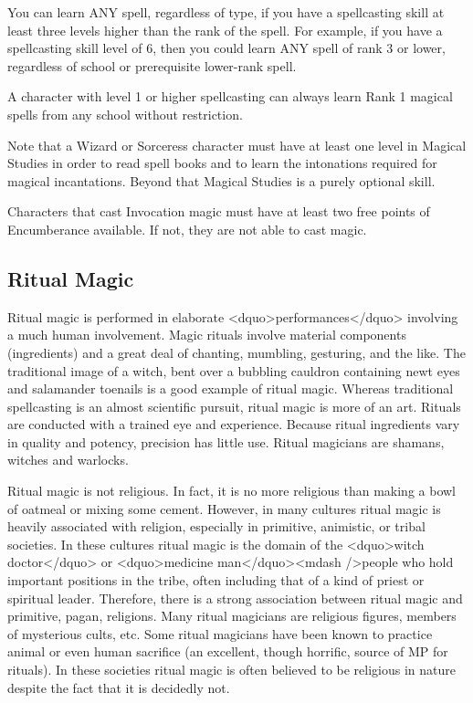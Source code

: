 You can learn ANY spell, regardless of type, if you have a
spellcasting skill at least three levels higher than the rank of the
spell.  For example, if you have a spellcasting skill level of 6, then
you could learn ANY spell of rank 3 or lower, regardless of school or
prerequisite lower-rank spell.

A character with level 1 or higher spellcasting can always learn Rank
1 magical spells from any school without restriction.

Note that a Wizard or Sorceress character must have at least one level
in Magical Studies in order to read spell books and to learn the
intonations required for magical incantations.  Beyond that Magical
Studies is a purely optional skill.

Characters that cast Invocation magic must have at least two free
points of Encumberance available.  If not, they are not able to cast
magic.


\subsection{Ritual Magic}

Ritual magic is performed in elaborate <dquo>performances</dquo> involving a
much human involvement.  Magic rituals involve material components
(ingredients) and a great deal of chanting, mumbling, gesturing, and
the like.  The traditional image of a witch, bent over a bubbling
cauldron containing newt eyes and salamander toenails is a good
example of ritual magic.  Whereas traditional spellcasting is an
almost scientific pursuit, ritual magic is more of an art. Rituals are
conducted with a trained eye and experience.  Because ritual
ingredients vary in quality and potency, precision has little
use. Ritual magicians are shamans, witches and warlocks.

Ritual magic is not religious.  In fact, it is no more religious than
making a bowl of oatmeal or mixing some cement.  However, in many
cultures ritual magic is heavily associated with religion, especially
in primitive, animistic, or tribal societies.  In these cultures
ritual magic is the domain of the <dquo>witch doctor</dquo> or <dquo>medicine
man</dquo><mdash />people who hold important positions in the tribe, often
including that of a kind of priest or spiritual leader.  Therefore,
there is a strong association between ritual magic and primitive,
pagan, religions.  Many ritual magicians are religious figures,
members of mysterious cults, etc.  Some ritual magicians have been
known to practice animal or even human sacrifice (an excellent, though
horrific, source of MP for rituals).  In these societies ritual magic
is often believed to be religious in nature despite the fact that it
is decidedly not.

